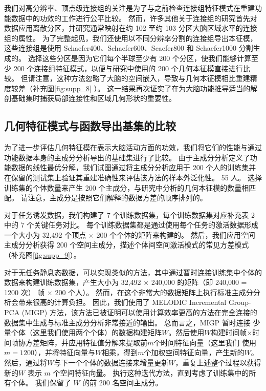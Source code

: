 \documentclass[lang=cn,a4paper,newtx]{elegantpaper}
\begin{document}
我们对高分辨率、顶点级连接组的关注是为了与之前检查连接组特征模式在重建功能数据中的功效的工作进行公平比较\cite{mitra2015lag,felleman1991distributed}。
然而，许多其他关于连接组的研究首先对数据应用离散分区，并研究通常映射在约 102 至约 103 分区大脑区域水平的连接组的属性\cite{chaudhuri2015large,goodale1992separate}。
为了完整起见，我们还使用以不同分辨率分割的连接组导出本征模，这些连接组是使用 Schaefer400、Schaefer600、Scaefer800 和 Schaefer1000 分割生成的。
选择这些分区是因为它们每个半球至少有 200 个分区，使我们能够计算至少 200 个连接组特征模式，以便与研究中使用的 200 个几何本征模直接进行比较。
但请注意，这种方法忽略了大脑的空间嵌入，导致与几何本征模相比重建精度较差（补充图\ref{fig:supp_8}
）。
这一结果再次证实了在为大脑功能推导适当的解剖基础集时捕获局部连接性和区域几何形状的重要性。




\subsection{几何特征模式与函数导出基集的比较} \label{sec:comparison_eigenmodes_derived}

为了进一步评估几何特征模在表示大脑活动方面的功效，我们将它们的性能与通过功能数据本身的主成分分析导出的基础集进行了比较。
由于主成分分析定义了功能数据的线性最优分解，我们试图通过将主成分分析应用于 200 个人的训练集并在保留的测试集上验证其重建准确性来评估该方法的样本外泛化性。 55 人。 
选择训练集的个体数量来产生 200 个主成分，与研究中分析的几何本征模的数量相匹配。
请注意，主成分是按照它们解释的数据方差的顺序排列的。


对于任务诱发数据，我们构建了 7 个训练数据集，每个训练数据集对应补充表 2 中的 7 个关键任务对比。
每个训练数据集都是通过使用每个任务的激活数据形成一个大小为 32,492 个顶点 $ \times $ 200 个个体的矩阵来构建的。
然后，我们应用空间主成分分析获得 200 个空间主成分，描述个体间空间激活模式的常见方差模式（补充图\ref{fig:supp_9}）。


对于无任务静息态数据，可以实现类似的方法，其中通过暂时连接训练集中个体的数据来构建训练数据集，产生大小为 32,492 $ \times $ 240,000 的矩阵（即 240,000 = 1200 次） 帧 × 200 个人）。
然而，在这个非常大的数据矩阵上执行标准主成分分析会带来很高的计算负担。
因此，我们使用了 MELODIC Incremental Group-PCA (MIGP) 方法，该方法已被证明可以使用计算效率更高的方法\cite{markov2014anatomy}在完全连接的数据集中生成与标准主成分分析非常接近的输出。
总而言之，MIGP 暂时连接 少量个体（这里我们使用两个个体）的数据构建矩阵$ W $。然后使用$ W $构建时间帧×时间帧协方差矩阵，并应用特征值分解来提取前$ m $个时间特征向量（这里我们 使用$ m = 1200 $），并将特征向量与$ W $相乘，得到$ m $个加权空间特征向量，产生新的$ W $。
然后，通过将$ W $与下一个个体的数据连接来增量更新$ W $，重复上述整个过程以获得新的$ W $ 表示 $ m $ 个空间特征向量。
执行这种迭代方法，直到考虑了训练集中的所有个体。
我们保留了 $ W $ 的前 200 名空间主成分。
\end{document}
